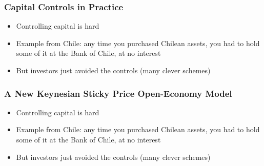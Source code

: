 \documentclass{beamer}
\begin{document}
\begin{frame}
\frametitle[alignment=center]{Capital Controls in Practice}
\begin{itemize}
\item Controlling capital is hard
\bigskip
\item  Example from Chile:  any time you purchased Chilean assets, you had to hold some of it at the Bank of Chile, at no interest
\bigskip
\item But investors just avoided the controls (many clever schemes)
\end{itemize}
\end{frame}



\begin{frame}
\frametitle[alignment=center]{A New Keynesian Sticky Price Open-Economy Model}
\begin{itemize}
\item Controlling capital is hard
\bigskip
\item  Example from Chile:  any time you purchased Chilean assets, you had to hold some of it at the Bank of Chile, at no interest
\bigskip
\item But investors just avoided the controls (many clever schemes)
\end{itemize}
\end{frame}
\end{document}
